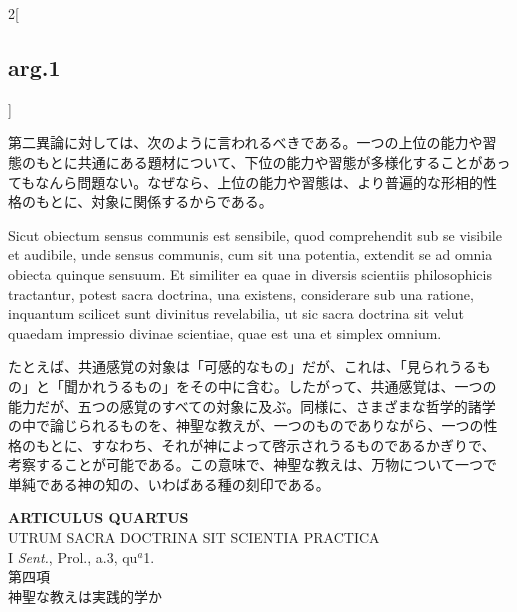 \documentclass[
paper=a4paper,
fontsize=10pt,
jafontsize=9pt,
titlepage
]{jlreq}
\begin{document}
\begin{paracol}{2}[\subsection{arg.1}]
\switchcolumn

第二異論に対しては、次のように言われるべきである。一つの上位の能力や習
態のもとに共通にある題材について、下位の能力や習態が多様化することがあっ
てもなんら問題ない。なぜなら、上位の能力や習態は、より普遍的な形相的性
格のもとに、対象に関係するからである。

\switchcolumn*

Sicut obiectum sensus communis est sensibile, quod comprehendit sub se
visibile et audibile, unde sensus communis, cum sit una potentia,
extendit se ad omnia obiecta quinque sensuum. Et similiter ea quae in
diversis scientiis philosophicis tractantur, potest sacra doctrina,
una existens, considerare sub una ratione, inquantum scilicet sunt
divinitus revelabilia, ut sic sacra doctrina sit velut quaedam
impressio divinae scientiae, quae est una et simplex omnium.

\switchcolumn

たとえば、共通感覚の対象は「可感的なもの」だが、これは、「見られうるも
の」と「聞かれうるもの」をその中に含む。したがって、共通感覚は、一つの
能力だが、五つの感覚のすべての対象に及ぶ。同様に、さまざまな哲学的諸学
の中で論じられるものを、神聖な教えが、一つのものでありながら、一つの性
格のもとに、すなわち、それが神によって啓示されうるものであるかぎりで、
考察することが可能である。この意味で、神聖な教えは、万物について一つで
単純である神の知の、いわばある種の刻印である。

\end{paracol}
\newpage



{}
\setcounter{section}{4}
\setcounter{subsection}{0}
\begin{center}
 {\Large {\bfseries ARTICULUS QUARTUS}}\\
 {\large UTRUM SACRA DOCTRINA SIT SCIENTIA PRACTICA}\\
 {\footnotesize I {\itshape Sent.}, Prol., a.3, qu$^a$1.}\\
 {\Large 第四項\\神聖な教えは実践的学か}
\end{center}
\end{document}
